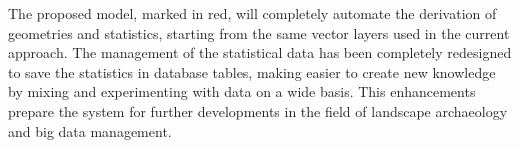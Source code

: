        The proposed model, marked in red, will completely automate the derivation of geometries and statistics, starting from the same vector layers used in the current approach. The management of the statistical data has been completely redesigned to save the statistics in database tables, making easier to create new knowledge by mixing and experimenting with data on a wide basis. This enhancements prepare the system for further developments in the field of landscape archaeology and big data management.
